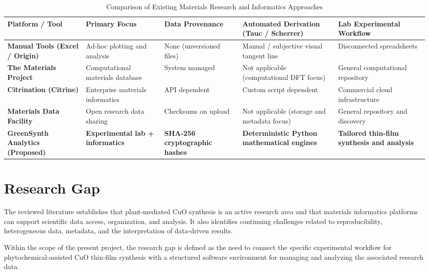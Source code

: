 \documentclass[12pt,a4paper,oneside]{report}
\begin{document}
{{{\begin{table}[h!]
\centering
\caption{Comparison of Existing Materials Research and Informatics Approaches}
\label{tab:lit_comparison}
\begin{tabular}{|p{3.0cm}|p{2.6cm}|p{2.4cm}|p{3.2cm}|p{3.2cm}|}
\hline
\textbf{Platform / Tool} & \textbf{Primary Focus} & \textbf{Data Provenance} & \textbf{Automated Derivation (Tauc / Scherrer)} & \textbf{Lab Experimental Workflow} \\
\hline
\textbf{Manual Tools (Excel / Origin)} & Ad-hoc plotting and analysis & None (unversioned files) & Manual / subjective visual tangent line & Disconnected spreadsheets \\
\hline
\textbf{The Materials Project} & Computational materials database & System managed & Not applicable (computational DFT focus) & General computational repository \\
\hline
\textbf{Citrination (Citrine)} & Enterprise materials informatics & API dependent & Custom script dependent & Commercial cloud infrastructure \\
\hline
\textbf{Materials Data Facility} & Open research data sharing & Checksums on upload & Not applicable (storage and metadata focus) & General repository and discovery \\
\hline
\textbf{GreenSynth Analytics (Proposed)} & \textbf{Experimental lab + informatics} & \textbf{SHA-256 cryptographic hashes} & \textbf{Deterministic Python mathematical engines} & \textbf{Tailored thin-film synthesis and analysis} \\
\hline
\end{tabular}
\end{table}

\section{Research Gap}

The reviewed literature establishes that plant-mediated $\text{CuO}$ synthesis is an active research area and that materials informatics platforms can support scientific data access, organization, and analysis. It also identifies continuing challenges related to reproducibility, heterogeneous data, metadata, and the interpretation of data-driven results.

Within the scope of the present project, the research gap is defined as the need to connect the specific experimental workflow for phytochemical-assisted $\text{CuO}$ thin-film synthesis with a structured software environment for managing and analyzing the associated research data.

}}}
\end{document}
